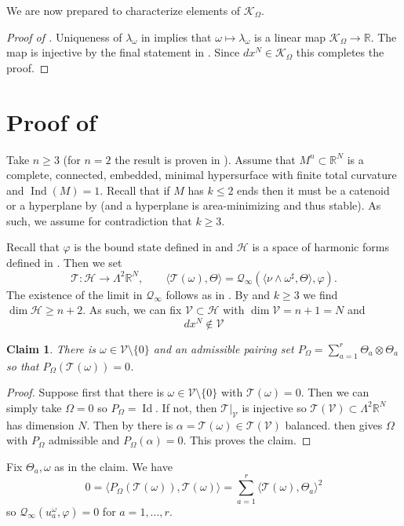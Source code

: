 \documentclass[11pt]{amsart}
\numberwithin{equation}{section}
\theoremstyle{plain}
\newtheorem{claim}[claim]{Claim}
\theoremstyle{definition}
\theoremstyle{remark}
\newcommand{\R}{\mathbb{R}}
\DeclareMathOperator{\Ind}{Ind}
\DeclareMathOperator{\Id}{Id}
\newcommand{\Hcal}{\mathcal H}
\newcommand{\Kcal}{\mathcal K}
\newcommand{\Vcal}{\mathcal V}
\newcommand{\Tcal}{\mathcal T}
\newcommand{\Qcal}{\mathcal Q}
\newcommand{\bangle}[1]{\langle #1 \rangle}
\begin{document}
We are now prepared to characterize elements of $\Kcal_\Omega$.
\begin{proof}[Proof of ]
Uniqueness of $\lambda_\omega$ in  implies that $\omega \mapsto \lambda_\omega$ is a linear map $\Kcal_\Omega\to\R$. The map is injective by the final statement in . Since $dx^N \in \Kcal_\Omega$ this completes the proof. 
\end{proof}

\section{Proof of }\label{sec:proof-main}

Take $n\geq 3$ (for $n=2$ the result is proven in \cite{LopezRos1989}). Assume that $M^n\subset \R^N$ is a complete, connected, embedded, minimal hypersurface with finite total curvature and $\Ind(M) = 1$. Recall that if $M$ has $k \leq 2$ ends then it must be a catenoid or a hyperplane by \cite{Schoen1983} (and a hyperplane is area-minimizing and thus stable).  As such, we assume for contradiction that $k\geq 3$. 

Recall that $\varphi$ is the bound state defined in  and $\Hcal$ is a space of harmonic forms defined in . Then we set
\[
\Tcal : \Hcal \to \Lambda^2 \R^N, \qquad \bangle{\Tcal(\omega),\Theta} = \Qcal_\infty(\bangle{\nu\wedge \omega^\sharp,\Theta},\varphi). 
\]
The existence of the limit in $\Qcal_\infty$ follows as in . By  and $k\geq 3$ we find $\dim \Hcal \geq n+2$. As such, we can fix $\Vcal \subset \Hcal$ with $\dim \Vcal = n+1= N$ and 
\begin{equation}\label{eq:dxN-not-in-W}
dx^N \not \in \Vcal
\end{equation}

\begin{claim}
There is $\omega \in \Vcal\setminus\{0\}$ and an admissible pairing set $P_\Omega = \sum_{a=1}^r \Theta_a \otimes\Theta_a$ so that $P_\Omega (\Tcal(\omega)) = 0$. 
\end{claim}
\begin{proof}
Suppose first that there is $\omega \in \Vcal\setminus\{0\}$ with $\Tcal(\omega) =0$. Then we can simply take $\Omega = 0$ so $P_\Omega = \Id$. If not, then $\Tcal|_\Vcal$ is injective so $\Tcal(\Vcal) \subset \Lambda^2\R^N$ has dimension $N$. Then by  there is $\alpha = \Tcal(\omega) \in \Tcal(\Vcal)$ balanced.  then gives $\Omega$ with $P_\Omega$ admissible and $P_\Omega(\alpha) = 0$. This proves the claim. 
\end{proof}
Fix $\Theta_a,\omega$ as in the claim. We have
\[
0 = \bangle{P_\Omega(\Tcal(\omega)),\Tcal(\omega)} = \sum_{a=1}^r \bangle{\Tcal(\omega),\Theta_a}^2
\]
so $\Qcal_\infty(u^\omega_a,\varphi) = 0$ for $a=1,\dots,r$. 
\end{document}
